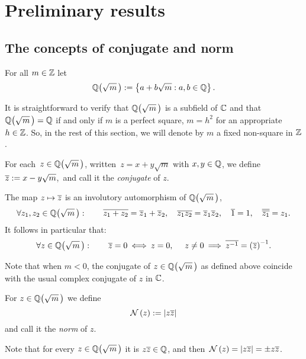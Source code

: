 \chapter{Preliminary results}\label{preliminary}

\section{The concepts of conjugate and norm}\label{conj_and_norm}

\begin{defn}
For all $m\in \mathbb{Z}$ let
\begin{equation}\label{quadraticField}
\QQ{m} := \left\{ a + b\sqrt m: a,b \in \Q\right\}.
\end{equation}
\end{defn}

It is straightforward to verify that $\QQ{m}$ is a subfield of $\mathbb{C}$
and that $\QQ{m} = \Q$ if and only if $m$ is a perfect square, \ie
$m = h^2$ for an appropriate $h\in\mathbb{Z}$.
So, in the rest of this section, we will denote by $m$
a fixed non-square in $\mathbb{Z}$.

\begin{defn}\label{conjugatedef}
For each\, $z \in \QQ{m}$, written\, $z = x + y\sqrt m$ with $x,y \in \mathbb{Q}$,
we define\, $\overline{z}:= x - y\sqrt m$,\, and call it the {\emph{conjugate}}
of $z$.
\end{defn}


The map $z\mapsto \overline{z}$ is an involutory automorphism of $\QQ{m}$, \ie
%
\begin{equation}\label{conjugate1}
\forall z_1,z_2 \in \QQ{m}: \qquad
\cg{z_1 + z_2}= \cg z_1 + \cg z_2, \quad
\cg{z_1z_2} = \cg z_1\cg z_2 , \quad
\cg1 = 1, \quad \cg{\cg{z_1}} = z_1.
\end{equation}
%
It follows in particular that:
\begin{equation}\label{conjugate2}
\forall z\in \QQ{m}:\qquad
\cg{z} = 0 \iff z=0,\quad\
z\not=0 \then \cg{z^{-1}}= {({\cg z})}^{-1}.
\end{equation}

Note that when $m < 0$, the conjugate of $z \in \QQ{m}$ as defined
above coincide with the usual complex conjugate of $z$ in $\mathbb{C}$.

\begin{defn}\label{normdef}
For $z\in \QQ{m}$ we define $$\mathcal{N}\left(z\right):= \left|z \overline{z}\right|$$
and call it the {\emph{norm}} of $z$.
\end{defn}
Note that for every $z\in \QQ{m}$ it is
$z\overline{z} \in \mathbb{Q}$, and then\, $\mathcal{N}\left(z\right) = \left|z \overline{z}\right|
= \pm{z \overline{z}}$.


